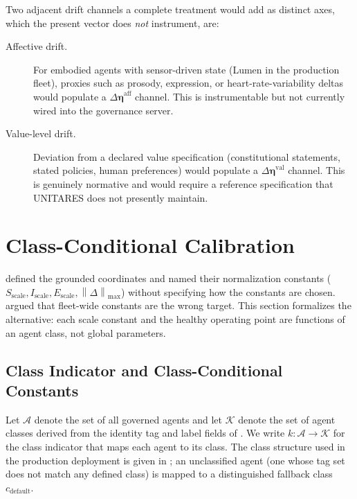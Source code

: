 \documentclass[11pt,twocolumn]{article}
\newcommand{\norm}[1]{\left\lVert #1 \right\rVert}
\newcommand{\deta}{\ensuremath{\Delta\bm{\eta}}}
\begin{document}
Two adjacent drift channels a complete treatment would add as
distinct axes, which the present vector does \emph{not}
instrument, are:

\begin{description}
\item[Affective drift.] For embodied agents with sensor-driven
  state (Lumen in the production fleet), proxies such as prosody,
  expression, or heart-rate-variability deltas would populate a
  $\deta^{\text{aff}}$ channel. This is instrumentable but not
  currently wired into the governance server.
\item[Value-level drift.] Deviation from a declared value
  specification (constitutional statements, stated policies,
  human preferences) would populate a $\deta^{\text{val}}$
  channel. This is genuinely normative and would require a
  reference specification that UNITARES does not presently
  maintain.
\end{description}


\section{Class-Conditional Calibration}
\label{sec:class-calibration}

 defined the grounded coordinates and named
their normalization constants
($S_{\text{scale}}, I_{\text{scale}}, E_{\text{scale}},
\norm{\Delta}_{\max}$) without specifying how the constants are
chosen.  argued that fleet-wide constants
are the wrong target. This section formalizes the alternative:
each scale constant and the healthy operating point are functions
of an agent class, not global parameters.

\subsection{Class Indicator and Class-Conditional Constants}

Let $\mathcal{A}$ denote the set of all governed agents and let
$\mathcal{K}$ denote the set of agent classes derived from the
identity tag and label fields of . We
write $k : \mathcal{A} \to \mathcal{K}$ for the class indicator
that maps each agent to its class. The class structure used in the
production deployment is given in ; an
unclassified agent (one whose tag set does not match any defined
class) is mapped to a distinguished fallback class
$c_{\text{default}}$.
\end{document}
